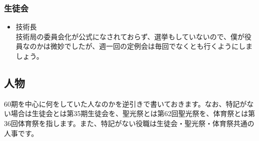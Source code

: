 \documentclass[dvipdfmx,jb5]{jarticle}
\begin{document}
\subsubsection{生徒会}
\begin{itemize}
  \item 技術長\\
  技術局の委員会化が公式になされておらず、選挙もしていないので、僕が役員なのかは微妙でしたが、週一回の定例会は毎回でなくとも行くようにしましょう。
\end{itemize}
\subsection{人物}
60期を中心に何をしていた人なのかを逆引きで書いておきます。なお、特記がない場合は生徒会とは第35期生徒会を、聖光祭とは第62回聖光祭を、体育祭とは第36回体育祭を指します。また、特記がない役職は生徒会・聖光祭・体育祭共通の人事です。
\end{document}
